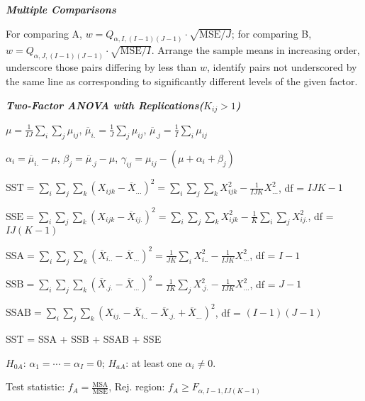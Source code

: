 \documentclass{article}
\newcommand{\smalltitle}[1]{
	\noindent
	\textbf{\textit{#1}}
}
\begin{document}
	\smalltitle{Multiple Comparisons}
	
	For comparing A, $w = Q _ { \alpha , I , ( I - 1 ) ( J - 1 ) } \cdot \sqrt{\mathrm{ MSE }/J}$; for comparing B, $w = Q _ { \alpha , J , ( I - 1 ) ( J - 1 ) } \cdot \sqrt{\mathrm{ MSE }/I}$.
	Arrange the sample means in increasing order, underscore those pairs differing by less than $w$, identify pairs not underscored by the same line as corresponding to significantly different levels of the given factor.
	
	\smalltitle{Two-Factor ANOVA with Replications($\mathbf{\mathit{K_{ij}>1}}$)}
	
	$\mu = \frac { 1 } { I J } \sum _ { i } \sum _ { j } \mu _ { i j }$,
	$\overline { \mu } _ { i . } = \frac { 1 } { J } \sum _ { j } \mu _ { i j }$,
	$\overline { \mu } _ { . j } = \frac { 1 } { I } \sum _ { i } \mu _ { i j }$
	
	$\alpha_i = \overline{ \mu }_{i.} - \mu$, $\beta_j = \overline{\mu} _{.j} - \mu$, $\gamma_{ij} = \mu_{ij} - (\mu + \alpha _ i + \beta_j) $
	
	{\small
		
		\noindent
		$\mathrm{ SST } = \sum \limits_i \sum \limits_j \sum \limits_k (X_{ijk} - \overline{ X }_{...})^2 = \sum \limits_i \sum \limits_j \sum \limits_k X^2_{ijk} - \frac{1}{IJK}X^2_{...} $, df = $IJK - 1$
		
		\noindent
		{\footnotesize
			$\mathrm{ SSE } = \sum \limits_i \sum \limits_j \sum \limits_k (X_{ijk} - \overline{ X }_{ij.})^2 = \sum \limits_i \sum \limits_j \sum \limits_k X^2_{ijk} - \frac{1}{K} \sum \limits_i \sum \limits_j X^2_{ij.}$, df = $IJ(K-1)$
		}
		
		\noindent
		$\mathrm{SSA} = \sum_i \sum_j \sum_k (\overline{ X }_{i..} - \overline{ X }_{...})^2 = \frac{1}{JK} \sum_i X^2_{i..} - \frac{1}{IJK}X^2_{...}$, df = $I-1$
		
		\noindent
		$\mathrm{ SSB } = \sum_i \sum_j \sum_k (\overline{ X }_{.j.} - \overline{ X }_{...})^2 = \frac{1}{IK}\sum_j X^2_{.j.} - \frac{1}{IJK}X^2_{...}$, df = $J-1$
		
		\noindent
		$\mathrm{ SSAB } = \sum_i \sum_j \sum_k (X_{ij.} - \overline{ X }_{i..} - \overline{ X }_{.j.} + \overline{ X }_{...})^2 $, df = $(I-1)(J-1)$
		
	}
	
	\noindent
	SST = SSA + SSB + SSAB + SSE
	
	$H_{0A}$: $\alpha_1 = \cdots = \alpha_I = 0$; $H_{aA}$: at least one $\alpha_i \neq 0$.
	
	\noindent
	Test statistic: $f_A = \frac{\mathrm{MSA}}{\mathrm{ MSE }} $, Rej. region: $f_A \geq F_{\alpha,I-1,IJ(K-1)}$
	
\end{document}
